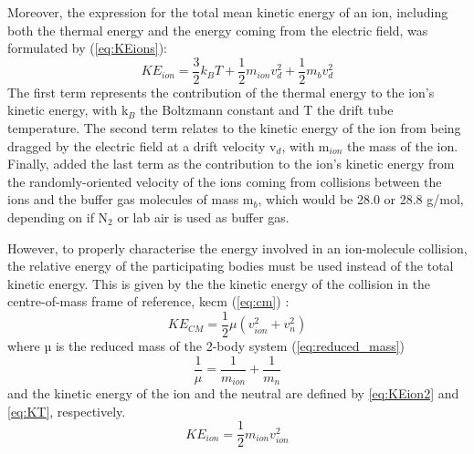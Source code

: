 
Moreover, the expression for the total mean kinetic  energy of an ion, including both the thermal energy and the energy coming from the electric field, was formulated by \citeauthor{wannier1951bell} \cite{wannier1951bell,wannier1952motion} (\autoref{eq:KEions}):
\begin{equation}
    \label{eq:KEions}
    KE_{ion} = \frac{3}{2}k_B T + \frac{1}{2}m_{ion} v_d^2 + \frac{1}{2}m_b v_d^2
\end{equation}
The first term represents the contribution of the thermal energy to the ion's kinetic energy, with k$_B$ the Boltzmann constant and T  the drift tube temperature.
The second term relates to the kinetic energy of the ion from being dragged by the electric field at a drift velocity v$_d$, with m$_{ion}$ the mass of the ion.
Finally, \citeauthor{wannier1951bell} added the last term as the contribution to the ion's kinetic energy  from the randomly-oriented velocity of the ions coming from collisions between the ions and the buffer gas molecules of mass m$_b$, which would be 28.0 or 28.8 g/mol, depending on if N$_2$ or lab air is used as buffer gas.

However, to properly characterise the energy involved in an ion-molecule collision, the relative energy of the participating bodies must be used instead of the total kinetic energy. This is given by the
the kinetic energy of the collision %
in the centre-of-mass frame of reference, \acrshort{kecm} (\autoref{eq:cm}) \cite{mcfarland1973flow}:
\begin{equation}
\label{eq:cm}
KE_{CM} = \frac{1}{2}\mu (v_{ion}^2 + v_n^2)
\end{equation}
where µ is the reduced mass of the 2-body system (\autoref{eq:reduced_mass})%
\begin{equation}
\label{eq:reduced_mass}
\frac{1}{\mu} = \frac{1}{m_{ion}} + \frac{1}{m_{n}}
\end{equation}
and the kinetic energy of the ion and the neutral are defined by \autoref{eq:KEion2} and \autoref{eq:KT}, respectively.
\begin{equation}
\label{eq:KEion2}
KE_{ion} = \frac{1}{2}m_{ion}v_{ion}^2
\end{equation}

